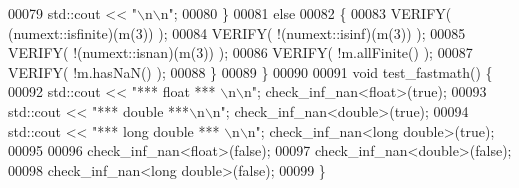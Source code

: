 \begin{DoxyCode}
00079     std::cout << \textcolor{stringliteral}{"\(\backslash\)n\(\backslash\)n"};
00080   \}
00081   \textcolor{keywordflow}{else}
00082   \{
00083     VERIFY(  (numext::isfinite)(m(3)) );
00084     VERIFY( !(numext::isinf)(m(3)) );
00085     VERIFY( !(numext::isnan)(m(3)) );
00086     VERIFY( !m.allFinite() );
00087     VERIFY( !m.hasNaN() );
00088   \}
00089 \}
00090 
00091 \textcolor{keywordtype}{void} test\_fastmath() \{
00092   std::cout << \textcolor{stringliteral}{"*** float *** \(\backslash\)n\(\backslash\)n"}; check\_inf\_nan<float>(\textcolor{keyword}{true});
00093   std::cout << \textcolor{stringliteral}{"*** double ***\(\backslash\)n\(\backslash\)n"}; check\_inf\_nan<double>(\textcolor{keyword}{true});
00094   std::cout << \textcolor{stringliteral}{"*** long double *** \(\backslash\)n\(\backslash\)n"}; check\_inf\_nan<long double>(\textcolor{keyword}{true});
00095 
00096   check\_inf\_nan<float>(\textcolor{keyword}{false});
00097   check\_inf\_nan<double>(\textcolor{keyword}{false});
00098   check\_inf\_nan<long double>(\textcolor{keyword}{false});
00099 \}
\end{DoxyCode}
